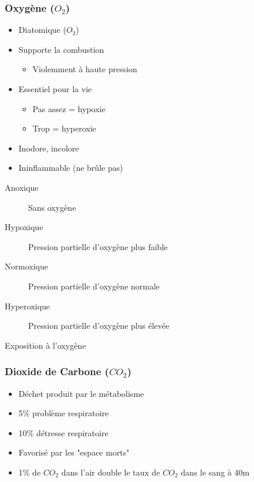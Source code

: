 \documentclass[aspectratio=1610,english,12pt]{beamer}
\begin{document}
\subsubsection{Oxygène ($O_2$)}
\begin{frame}{\insertsubsubsection}
	\begin{itemize}
		\item Diatomique ($O_2$)
		\item Supporte la combustion
		\begin{itemize}
			\item Violemment à haute pression
		\end{itemize}
		\item Essentiel pour la vie
		\begin{itemize}
			\item Pas assez = hypoxie
			\item Trop = hyperoxie
		\end{itemize}
		\item Inodore, incolore
		\item Ininflammable (ne brûle pas)
	\end{itemize}
\end{frame}

\begin{frame}{\insertsubsubsection}
	\begin{description}
		\item[Anoxique]Sans oxygène
		\item[Hypoxique]Pression partielle d'oxygène plus faible
		\item[Normoxique]Pression partielle d'oxygène normale
		\item[Hyperoxique]Pression partielle d'oxygène plus élevée
	\end{description}
\end{frame}

\begin{frame}{Exposition à l'oxygène}
\end{frame}

\subsubsection{Dioxide de Carbone ($CO_2$)}
\begin{frame}{\insertsubsubsection}
	\begin{itemize}
		\item Déchet produit par le métabolisme
		\item 5\% problème respiratoire
		\item 10\% détresse respiratoire
		\item Favorisé par les "espace morts"
		\item 1\% de $CO_2$ dans l'air double le taux de $CO_2$ dans le sang à 40m
	\end{itemize}
\end{frame}
\end{document}
